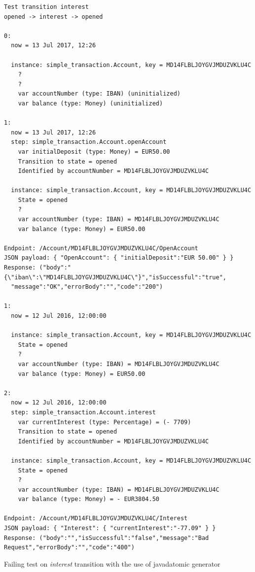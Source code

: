 \begin{sourcecode}[h!]
\begin{lstlisting}[]
Test transition interest
opened -> interest -> opened

0:
  now = 13 Jul 2017, 12:26

  instance: simple_transaction.Account, key = MD14FLBLJOYGVJMDUZVKLU4C
    ?
    ?
    var accountNumber (type: IBAN) (uninitialized)
    var balance (type: Money) (uninitialized)

1:
  now = 13 Jul 2017, 12:26
  step: simple_transaction.Account.openAccount
    var initialDeposit (type: Money) = EUR50.00
    Transition to state = opened
    Identified by accountNumber = MD14FLBLJOYGVJMDUZVKLU4C

  instance: simple_transaction.Account, key = MD14FLBLJOYGVJMDUZVKLU4C
    State = opened
    ?
    var accountNumber (type: IBAN) = MD14FLBLJOYGVJMDUZVKLU4C
    var balance (type: Money) = EUR50.00

Endpoint: /Account/MD14FLBLJOYGVJMDUZVKLU4C/OpenAccount
JSON payload: { "OpenAccount": { "initialDeposit":"EUR 50.00" } }
Response: ("body":"{\"iban\":\"MD14FLBLJOYGVJMDUZVKLU4C\"}","isSuccessful":"true",
  "message":"OK","errorBody":"","code":"200")

1:
  now = 12 Jul 2016, 12:00:00

  instance: simple_transaction.Account, key = MD14FLBLJOYGVJMDUZVKLU4C
    State = opened
    ?
    var accountNumber (type: IBAN) = MD14FLBLJOYGVJMDUZVKLU4C
    var balance (type: Money) = EUR50.00

2:
  now = 12 Jul 2016, 12:00:00
  step: simple_transaction.Account.interest
    var currentInterest (type: Percentage) = (- 7709)
    Transition to state = opened
    Identified by accountNumber = MD14FLBLJOYGVJMDUZVKLU4C

  instance: simple_transaction.Account, key = MD14FLBLJOYGVJMDUZVKLU4C
    State = opened
    ?
    var accountNumber (type: IBAN) = MD14FLBLJOYGVJMDUZVKLU4C
    var balance (type: Money) = - EUR3804.50

Endpoint: /Account/MD14FLBLJOYGVJMDUZVKLU4C/Interest
JSON payload: { "Interest": { "currentInterest":"-77.09" } }
Response: ("body":"","isSuccessful":"false","message":"Bad Request","errorBody":"","code":"400")
\end{lstlisting}
\caption{Failing test on \textit{interest} transition with the use of javadatomic generator}\label{fig:result-javadatomic-interest}
\end{sourcecode}
\FloatBarrier

